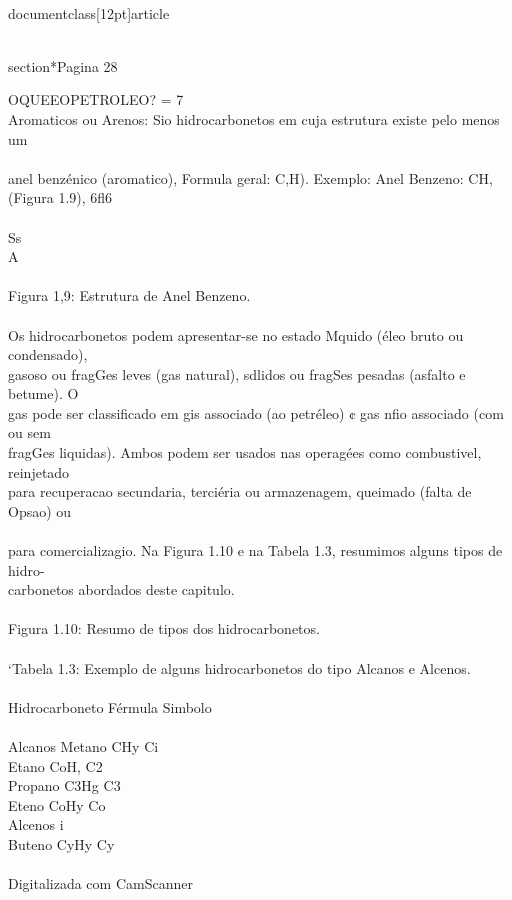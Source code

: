 \\documentclass[12pt]{article}
\begin{document}
{\\section*{Pagina 28}

OQUEEOPETROLEO? = 7\\
Aromaticos ou Arenos: Sio hidrocarbonetos em cuja estrutura existe pelo menos um\\
\\
anel benzénico (aromatico), Formula geral: C,H). Exemplo: Anel Benzeno: CH,\\
(Figura 1.9), 6fl6\\
\\
Ss\\
A\\
\\
Figura 1,9: Estrutura de Anel Benzeno.\\
\\
Os hidrocarbonetos podem apresentar-se no estado Mquido (éleo bruto ou condensado),\\
gasoso ou fragGes leves (gas natural), sdlidos ou fragSes pesadas (asfalto e betume). O\\
gas pode ser classificado em gis associado (ao petréleo) ¢ gas nfio associado (com ou sem\\
fragGes liquidas). Ambos podem ser usados nas operagées como combustivel, reinjetado\\
para recuperacao secundaria, terciéria ou armazenagem, queimado (falta de Opsao) ou\\
\\
para comercializagio. Na Figura 1.10 e na Tabela 1.3, resumimos alguns tipos de hidro-\\
carbonetos abordados deste capitulo.\\
\\
Figura 1.10: Resumo de tipos dos hidrocarbonetos.\\
\\
‘Tabela 1.3: Exemplo de alguns hidrocarbonetos do tipo Alcanos e Alcenos.\\
\\
Hidrocarboneto Férmula Simbolo\\
\\
Alcanos Metano CHy Ci\\
Etano CoH, C2\\
Propano C3Hg C3\\
Eteno CoHy Co\\
Alcenos i\\
Buteno CyHy Cy\\
\\
Digitalizada com CamScanner\\

}
\end{document}
